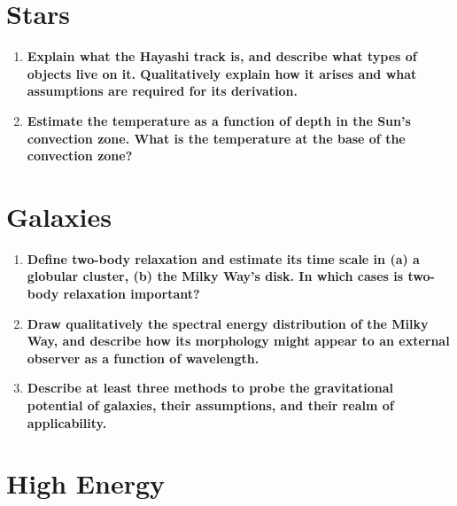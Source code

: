 \documentclass[12pt, letterpaper, preprint]{aastex}
\begin{document}
\section*{Stars}
\begin{enumerate}
  \item \textbf{Explain what the Hayashi track is, 
      and describe what types of objects live on it.
      Qualitatively explain how it arises and what 
      assumptions are required for its derivation.}
  \item \textbf{Estimate the temperature as a function 
      of depth in the Sun’s convection zone.
      What is the temperature at the base of the convection zone?}
\end{enumerate}

\section*{Galaxies}

\begin{enumerate}

\item \textbf{Define two-body relaxation and estimate its time scale in (a) a globular cluster, (b) the Milky Way's disk. In which cases is two-body relaxation important?}

\item \textbf{Draw qualitatively the spectral energy distribution of the Milky Way, and describe how its morphology might appear to an external observer as a function of wavelength.}

\item \textbf{Describe at least three methods to probe the gravitational potential of galaxies, their assumptions, and their realm of applicability.}

\end{enumerate}

\section*{High Energy}
\end{document}
